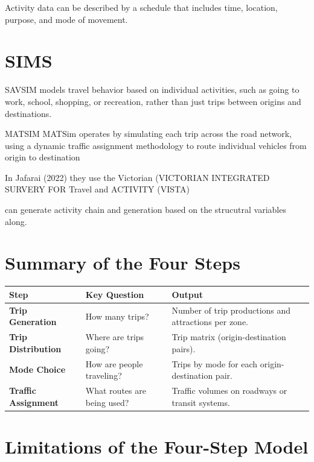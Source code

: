 \documentclass[../main.tex]{subfiles}
\begin{document}
Activity data can be described by a schedule that includes time, location, 
purpose, and mode of movement.

\section{SIMS}
SAVSIM models travel behavior based on individual activities, such as going to work, school, shopping, or recreation, rather than just trips between origins and destinations. \citep{SACSIM}


MATSIM MATSim operates by simulating each trip across the
road network, using a dynamic traffic assignment methodology to route individual vehicles
from origin to destination



In Jafarai (2022) they use the Victorian (VICTORIAN INTEGRATED SURVERY FOR Travel and ACTIVITY (VISTA)

\citep{joubert} can generate activity chain and generation based on the strucutral variables along.





\section*{Summary of the Four Steps}

\begin{tabular}{|>{\raggedright\arraybackslash}m{4cm}|>{\raggedright\arraybackslash}m{6cm}|>{\raggedright\arraybackslash}m{6cm}|}
\hline
\textbf{Step} & \textbf{Key Question} & \textbf{Output} \\ \hline
\textbf{Trip Generation} & How many trips? & Number of trip productions and attractions per zone. \\ \hline
\textbf{Trip Distribution} & Where are trips going? & Trip matrix (origin-destination pairs). \\ \hline
\textbf{Mode Choice} & How are people traveling? & Trips by mode for each origin-destination pair. \\ \hline
\textbf{Traffic Assignment} & What routes are being used? & Traffic volumes on roadways or transit systems. \\ \hline
\end{tabular}

\section*{Limitations of the Four-Step Model}
\end{document}
